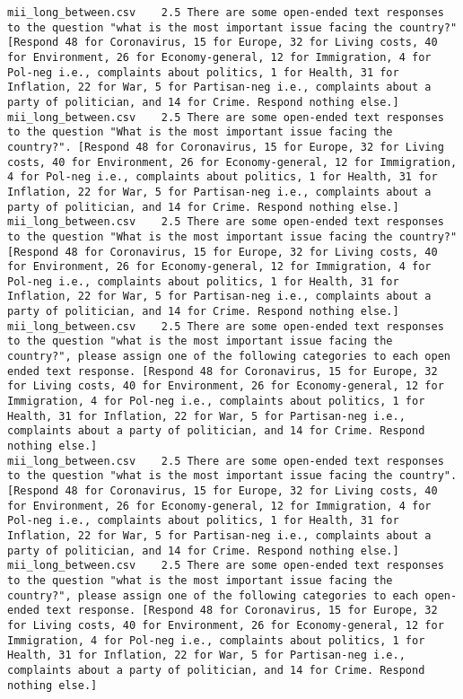 \begin{lstlisting}[label=lst:promptvariants]
mii_long_between.csv	2.5	There are some open-ended text responses to the question "what is the most important issue facing the country?" [Respond 48 for Coronavirus, 15 for Europe, 32 for Living costs, 40 for Environment, 26 for Economy-general, 12 for Immigration, 4 for Pol-neg i.e., complaints about politics, 1 for Health, 31 for Inflation, 22 for War, 5 for Partisan-neg i.e., complaints about a party of politician, and 14 for Crime. Respond nothing else.]
mii_long_between.csv	2.5	There are some open-ended text responses to the question "What is the most important issue facing the country?". [Respond 48 for Coronavirus, 15 for Europe, 32 for Living costs, 40 for Environment, 26 for Economy-general, 12 for Immigration, 4 for Pol-neg i.e., complaints about politics, 1 for Health, 31 for Inflation, 22 for War, 5 for Partisan-neg i.e., complaints about a party of politician, and 14 for Crime. Respond nothing else.]
mii_long_between.csv	2.5	There are some open-ended text responses to the question "What is the most important issue facing the country?" [Respond 48 for Coronavirus, 15 for Europe, 32 for Living costs, 40 for Environment, 26 for Economy-general, 12 for Immigration, 4 for Pol-neg i.e., complaints about politics, 1 for Health, 31 for Inflation, 22 for War, 5 for Partisan-neg i.e., complaints about a party of politician, and 14 for Crime. Respond nothing else.]
mii_long_between.csv	2.5	There are some open-ended text responses to the question "what is the most important issue facing the country?", please assign one of the following categories to each open ended text response. [Respond 48 for Coronavirus, 15 for Europe, 32 for Living costs, 40 for Environment, 26 for Economy-general, 12 for Immigration, 4 for Pol-neg i.e., complaints about politics, 1 for Health, 31 for Inflation, 22 for War, 5 for Partisan-neg i.e., complaints about a party of politician, and 14 for Crime. Respond nothing else.]
mii_long_between.csv	2.5	There are some open-ended text responses to the question "what is the most important issue facing the country". [Respond 48 for Coronavirus, 15 for Europe, 32 for Living costs, 40 for Environment, 26 for Economy-general, 12 for Immigration, 4 for Pol-neg i.e., complaints about politics, 1 for Health, 31 for Inflation, 22 for War, 5 for Partisan-neg i.e., complaints about a party of politician, and 14 for Crime. Respond nothing else.]
mii_long_between.csv	2.5	There are some open-ended text responses to the question "what is the most important issue facing the country?", please assign one of the following categories to each open-ended text response. [Respond 48 for Coronavirus, 15 for Europe, 32 for Living costs, 40 for Environment, 26 for Economy-general, 12 for Immigration, 4 for Pol-neg i.e., complaints about politics, 1 for Health, 31 for Inflation, 22 for War, 5 for Partisan-neg i.e., complaints about a party of politician, and 14 for Crime. Respond nothing else.]

\end{lstlisting}
